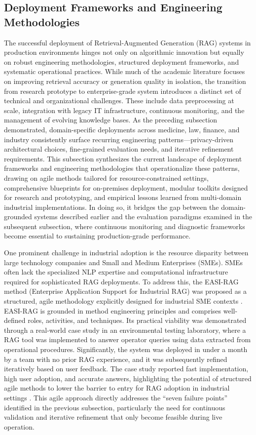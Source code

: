 \documentclass[11pt]{article}
\begin{document}
\subsection{Deployment Frameworks and Engineering Methodologies}

The successful deployment of Retrieval-Augmented Generation (RAG) systems in production environments hinges not only on algorithmic innovation but equally on robust engineering methodologies, structured deployment frameworks, and systematic operational practices. While much of the academic literature focuses on improving retrieval accuracy or generation quality in isolation, the transition from research prototype to enterprise-grade system introduces a distinct set of technical and organizational challenges. These include data preprocessing at scale, integration with legacy IT infrastructure, continuous monitoring, and the management of evolving knowledge bases. As the preceding subsection demonstrated, domain-specific deployments across medicine, law, finance, and industry consistently surface recurring engineering patterns---privacy-driven architectural choices, fine-grained evaluation needs, and iterative refinement requirements. This subsection synthesizes the current landscape of deployment frameworks and engineering methodologies that operationalize these patterns, drawing on agile methods tailored for resource-constrained settings, comprehensive blueprints for on-premises deployment, modular toolkits designed for research and prototyping, and empirical lessons learned from multi-domain industrial implementations. In doing so, it bridges the gap between the domain-grounded systems described earlier and the evaluation paradigms examined in the subsequent subsection, where continuous monitoring and diagnostic frameworks become essential to sustaining production-grade performance.

One prominent challenge in industrial adoption is the resource disparity between large technology companies and Small and Medium Enterprises (SMEs). SMEs often lack the specialized NLP expertise and computational infrastructure required for sophisticated RAG deployments. To address this, the EASI-RAG method (Enterprise Application Support for Industrial RAG) was proposed as a structured, agile methodology explicitly designed for industrial SME contexts \cite{ref568}. EASI-RAG is grounded in method engineering principles and comprises well-defined roles, activities, and techniques. Its practical viability was demonstrated through a real-world case study in an environmental testing laboratory, where a RAG tool was implemented to answer operator queries using data extracted from operational procedures. Significantly, the system was deployed in under a month by a team with no prior RAG experience, and it was subsequently refined iteratively based on user feedback. The case study reported fast implementation, high user adoption, and accurate answers, highlighting the potential of structured agile methods to lower the barrier to entry for RAG adoption in industrial settings \cite{ref568}. This agile approach directly addresses the ``seven failure points'' identified in the previous subsection, particularly the need for continuous validation and iterative refinement that only become feasible during live operation.
\end{document}
